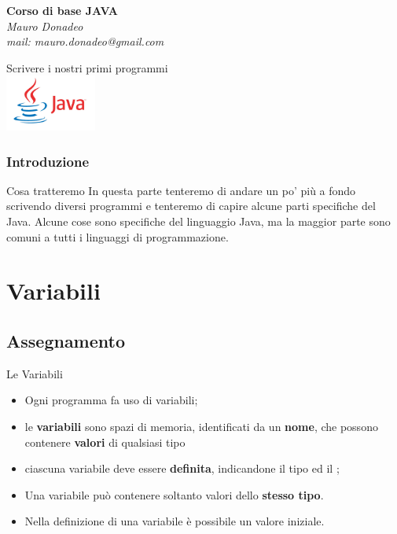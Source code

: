\begin{frame}
	\begin{block}{}
		\begin{center}
			{\large\textbf{Corso di base JAVA}}\\
			\itshape{Mauro Donadeo}\\
			mail: mauro.donadeo@gmail.com
		\end{center}
	\end{block}
	\begin{block}{}	
		\begin{center}
			\large{Scrivere i nostri primi programmi}\\
			\includegraphics[width = 30mm]{images/java-logo.jpg}
		\end{center}
	\end{block}	
\end{frame}

\begin{frame}
\frametitle{Introduzione}
\begin{block}{Cosa tratteremo}
In questa parte tenteremo di andare un po' più a fondo scrivendo diversi programmi e tenteremo di capire
alcune parti specifiche del Java. Alcune cose sono specifiche del linguaggio Java, ma la maggior parte 
sono comuni a tutti i linguaggi di programmazione.
\end{block}
\end{frame}

\section*{Variabili}
\subsection*{Assegnamento}
\begin{frame}
\begin{block}{Le Variabili}
\begin{itemize}
\item Ogni programma fa uso di variabili;
\item le \textbf{variabili} sono spazi di memoria, identificati da un \textbf{nome}, che possono contenere \textbf{valori}
di qualsiasi tipo
\item ciascuna variabile deve essere \textbf{definita}, indicandone il \alert{tipo} ed il ;
\item Una variabile può contenere soltanto valori dello \textbf{stesso tipo}.
\item Nella definizione di una variabile è possibile  un \alert{valore iniziale}.
\end{itemize}
\end{block}
\end{frame}

